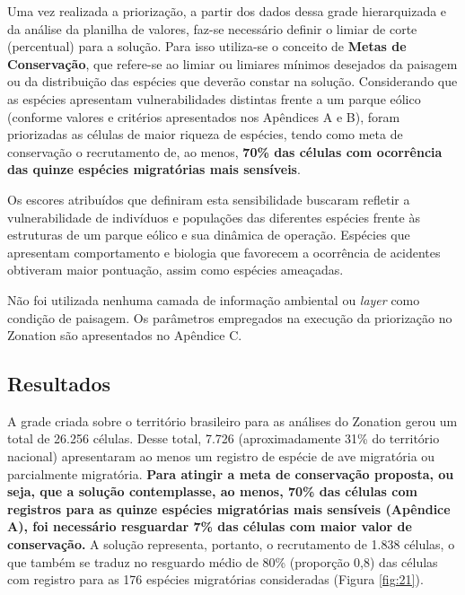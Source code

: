 \documentclass[
  oneside]{scrbook}
\begin{document}
Uma vez realizada a priorização, a partir dos dados dessa grade hierarquizada e da análise da planilha de valores, faz-se necessário definir o limiar de corte (percentual) para a solução. Para isso utiliza-se o conceito de \textbf{Metas de Conservação}, que refere-se ao limiar ou limiares mínimos desejados da paisagem ou da distribuição das espécies que deverão constar na solução. Considerando que as espécies apresentam vulnerabilidades distintas frente a um parque eólico (conforme valores e critérios apresentados nos Apêndices A e B), foram priorizadas as células de maior riqueza de espécies, tendo como meta de conservação o recrutamento de, ao menos, \textbf{70\% das células com ocorrência das quinze espécies migratórias mais sensíveis}.

Os escores atribuídos que definiram esta sensibilidade buscaram refletir a vulnerabilidade de indivíduos e populações das diferentes espécies frente às estruturas de um parque eólico e sua dinâmica de operação. Espécies que apresentam comportamento e biologia que favorecem a ocorrência de acidentes obtiveram maior pontuação, assim como espécies ameaçadas.

Não foi utilizada nenhuma camada de informação ambiental ou \emph{layer} como condição de paisagem. Os parâmetros empregados na execução da priorização no Zonation são apresentados no Apêndice C.

\hypertarget{resultados}{%
\subsection{Resultados}\label{resultados}}

A grade criada sobre o território brasileiro para as análises do Zonation gerou um total de 26.256 células. Desse total, 7.726 (aproximadamente 31\% do território nacional) apresentaram ao menos um registro de espécie de ave migratória ou parcialmente migratória. \textbf{Para atingir a meta de conservação proposta, ou seja, que a solução contemplasse, ao menos, 70\% das células com registros para as quinze espécies migratórias mais sensíveis (Apêndice A), foi necessário resguardar 7\% das células com maior valor de conservação.} A solução representa, portanto, o recrutamento de 1.838 células, o que também se traduz no resguardo médio de 80\% (proporção 0,8) das células com registro para as 176 espécies migratórias consideradas (Figura \ref{fig:21}).
\end{document}
